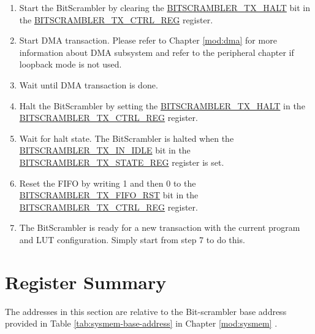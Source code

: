 \documentclass[main\_\_EN.tex]{subfiles}
\begin{document}
\begin{enumerate}
    \item Start the BitScrambler by clearing the \hyperref[fielddesc:BITSCRAMBLERTXHALT]{BITSCRAMBLER\_TX\_HALT} bit in the \hyperref[regdesc:BITSCRAMBLERTXCTRLREG]{BITSCRAMBLER\_TX\_CTRL\_REG} register.
    \item Start DMA transaction. Please refer to Chapter \ref{mod:dma} \textit{} for more information about DMA subsystem and refer to the peripheral chapter if loopback mode is not used.
    \item Wait until DMA transaction is done.
    \item Halt the BitScrambler by setting the \hyperref[fielddesc:BITSCRAMBLERTXHALT]{BITSCRAMBLER\_TX\_HALT} in the \hyperref[regdesc:BITSCRAMBLERTXCTRLREG]{BITSCRAMBLER\_TX\_CTRL\_REG} register.
    \item Wait for halt state. The BitScrambler is halted when the \hyperref[fielddesc:BITSCRAMBLERTXINIDLE]{BITSCRAMBLER\_TX\_IN\_IDLE} bit in the \hyperref[regdesc:BITSCRAMBLERTXSTATEREG]{BITSCRAMBLER\_TX\_STATE\_REG} register is set.
    \item Reset the FIFO by writing 1 and then 0 to the \hyperref[fielddesc:BITSCRAMBLERTXFIFORST]{BITSCRAMBLER\_TX\_FIFO\_RST} bit in the \hyperref[regdesc:BITSCRAMBLERTXCTRLREG]{BITSCRAMBLER\_TX\_CTRL\_REG} register.
    \item The BitScrambler is ready for a new transaction with the current program and LUT configuration. Simply start from step 7 to do this.
\end{enumerate}






\newpage
\hypertarget{bitscrm-reg-summ}{}
\section{Register Summary}
\label{sec:bitscrm-reg-summ}

The addresses in this section are relative to the Bit-scrambler base address provided in Table \ref{tab:sysmem-base-address} in Chapter \ref{mod:sysmem} \textit{}.
\end{document}
